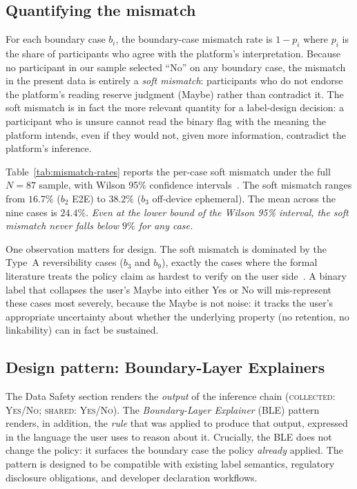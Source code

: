 \documentclass[11pt,a4paper]{article}
\begin{document}
\subsection{Quantifying the mismatch}\label{sec:quantify}

For each boundary case $b_i$, the boundary-case mismatch rate is
$1-p_i$ where $p_i$ is the share of participants who agree with the
platform's interpretation. Because no participant in our sample
selected ``No'' on any boundary case, the mismatch in the present
data is entirely a \emph{soft mismatch}: participants who do not
endorse the platform's reading reserve judgment (Maybe) rather than
contradict it. The soft mismatch is in fact the more relevant
quantity for a label-design decision: a participant who is unsure
cannot read the binary flag with the meaning the platform intends,
even if they would not, given more information, contradict the
platform's inference.



Table~\ref{tab:mismatch-rates} reports the per-case soft mismatch
under the full $N{=}87$ sample, with Wilson 95\% confidence
intervals~\citep{wilson:1927}. The soft mismatch ranges from
$16.7\%$ ($b_2$ E2E) to $38.2\%$ ($b_3$ off-device ephemeral). The
mean across the nine cases is $24.4\%$. \emph{Even at the lower
bound of the Wilson 95\% interval, the soft mismatch never falls
below $9\%$ for any case.}

One observation matters for design. The soft mismatch is dominated
by the Type~A reversibility cases ($b_3$ and $b_9$), exactly the
cases where the formal literature treats the policy claim as hardest
to verify on the user side~\citep{dwork:roth:2014,nissim:wood:2018}.
A binary label that collapses the user's Maybe into either Yes or No
will mis-represent these cases most severely, because the Maybe is
not noise: it tracks the user's appropriate uncertainty about
whether the underlying property (no retention, no linkability) can
in fact be sustained.

\subsection{Design pattern: Boundary-Layer Explainers}\label{sec:ble-pattern}

The Data Safety section renders the \emph{output} of the inference
chain (\textsc{collected: Yes/No}; \textsc{shared: Yes/No}). The
\emph{Boundary-Layer Explainer} (BLE) pattern renders, in addition,
the \emph{rule} that was applied to produce that output, expressed
in the language the user uses to reason about it. Crucially, the
BLE does not change the policy: it surfaces the boundary case the
policy \emph{already} applied. The pattern is designed to be
compatible with existing label semantics, regulatory disclosure
obligations, and developer declaration workflows.
\end{document}
